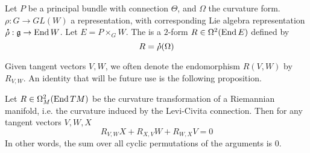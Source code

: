 %
\begin{defn}
Let $P$ be a principal bundle with connection $\Theta$, and $\Omega$ the curvature form.
$\rho : G \to GL(W)$ a representation, with corresponding Lie algebra representation
$\accentset{\mbox{\large\bfseries .}}{\rho} : \mathfrak{g} \to \operatorname{End} W$. Let $E = P \times_G W$. The 
is a $2$-form $R \in \Omega^2(\operatorname{End} E)$ defined by
\[
R = \accentset{\mbox{\large\bfseries .}}{\rho}(\Omega)
\]
\end{defn}
%
Given tangent vectors $V,W$, we often denote the endomorphism $R(V,W)$ by $R_{V,W}$.
%
An identity that will be future use is the following proposition.
%
\begin{prop}
Let $R \in \Omega^2_M(\operatorname{End} TM)$ be the curvature transformation of a Riemannian
manifold, i.e. the curvature induced by the Levi-Civita connection. Then for any tangent
vectors $V,W,X$
\[
R_{V, W}X + R_{X, V}W + R_{W, X}V = 0
\]
In other words, the sum over all cyclic permutations of the arguments is $0$.
\end{prop}
%